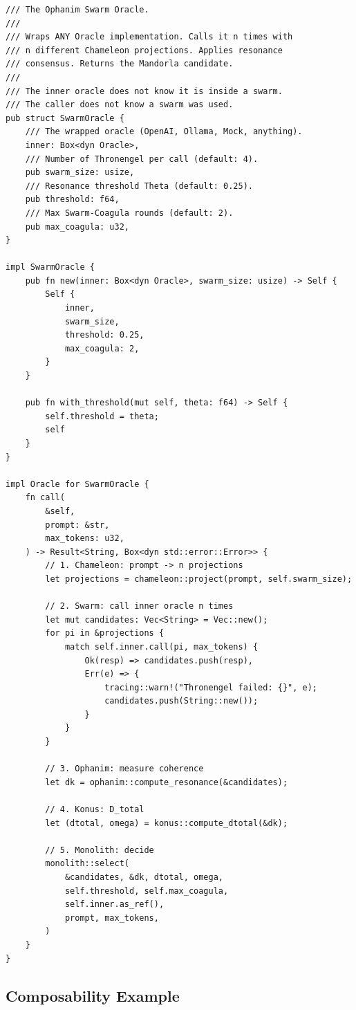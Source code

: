 \documentclass[11pt,a4paper]{article}
\begin{document}
\begin{lstlisting}[style=rust]
/// The Ophanim Swarm Oracle.
///
/// Wraps ANY Oracle implementation. Calls it n times with
/// n different Chameleon projections. Applies resonance
/// consensus. Returns the Mandorla candidate.
///
/// The inner oracle does not know it is inside a swarm.
/// The caller does not know a swarm was used.
pub struct SwarmOracle {
    /// The wrapped oracle (OpenAI, Ollama, Mock, anything).
    inner: Box<dyn Oracle>,
    /// Number of Thronengel per call (default: 4).
    pub swarm_size: usize,
    /// Resonance threshold Theta (default: 0.25).
    pub threshold: f64,
    /// Max Swarm-Coagula rounds (default: 2).
    pub max_coagula: u32,
}

impl SwarmOracle {
    pub fn new(inner: Box<dyn Oracle>, swarm_size: usize) -> Self {
        Self {
            inner,
            swarm_size,
            threshold: 0.25,
            max_coagula: 2,
        }
    }
    
    pub fn with_threshold(mut self, theta: f64) -> Self {
        self.threshold = theta;
        self
    }
}

impl Oracle for SwarmOracle {
    fn call(
        &self,
        prompt: &str,
        max_tokens: u32,
    ) -> Result<String, Box<dyn std::error::Error>> {
        // 1. Chameleon: prompt -> n projections
        let projections = chameleon::project(prompt, self.swarm_size);
        
        // 2. Swarm: call inner oracle n times
        let mut candidates: Vec<String> = Vec::new();
        for pi in &projections {
            match self.inner.call(pi, max_tokens) {
                Ok(resp) => candidates.push(resp),
                Err(e) => {
                    tracing::warn!("Thronengel failed: {}", e);
                    candidates.push(String::new());
                }
            }
        }
        
        // 3. Ophanim: measure coherence
        let dk = ophanim::compute_resonance(&candidates);
        
        // 4. Konus: D_total
        let (dtotal, omega) = konus::compute_dtotal(&dk);
        
        // 5. Monolith: decide
        monolith::select(
            &candidates, &dk, dtotal, omega,
            self.threshold, self.max_coagula,
            self.inner.as_ref(),
            prompt, max_tokens,
        )
    }
}
\end{lstlisting}

\subsection{Composability Example}
\end{document}
